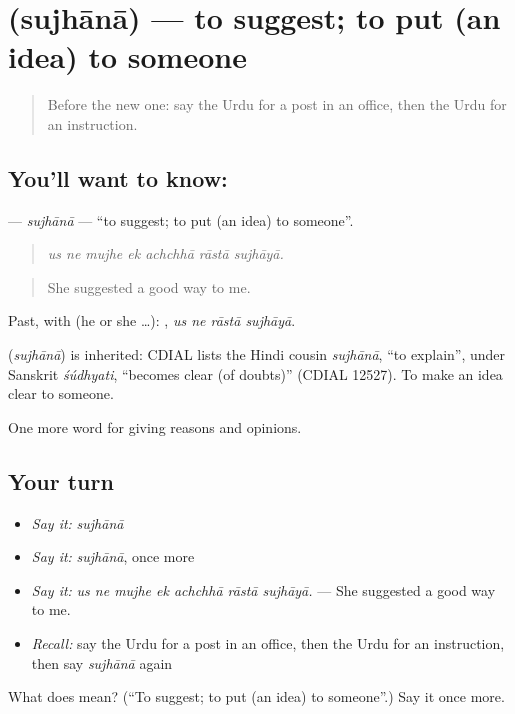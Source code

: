\section[\texorpdfstring{\ur{سجھانا} (sujhānā)}{سجھانا (sujhānā)}]{ (sujhānā) — to suggest; to put (an idea) to someone}

\label{lesson:UR-C343-sujhana}



\begin{quote}
Before the new one: say the Urdu for a post in an office, then the Urdu for an instruction.
\end{quote}

\subsection*{You'll want to know: }
\textbf{} — \emph{sujhānā} — \textquotedblleft{}to suggest; to put (an idea) to someone\textquotedblright{}.

\begin{quote}
      
\end{quote}

\begin{quote}
\emph{us ne mujhe ek achchhā rāstā sujhāyā.}
\end{quote}

\begin{quote}
She suggested a good way to me.
\end{quote}

Past, with  (he or she …):    , \emph{us ne rāstā sujhāyā}.

\begin{cousinweb}
\textbf{} (\emph{sujhānā}) is inherited: CDIAL lists the Hindi cousin \emph{sujhānā}, \textquotedblleft{}to explain\textquotedblright{}, under Sanskrit \emph{śúdhyati}, \textquotedblleft{}becomes clear (of doubts)\textquotedblright{} (CDIAL 12527). To make an idea clear to someone.
\end{cousinweb}

\begin{grammarlens}[title={What you've built}]
One more word for giving reasons and opinions.
\end{grammarlens}

\subsection*{Your turn}
\begin{itemize}
\raggedright
  \item \emph{Say it:} \emph{sujhānā}
  \item \emph{Say it:} \emph{sujhānā}, once more
  \item \emph{Say it:} \emph{us ne mujhe ek achchhā rāstā sujhāyā.} — She suggested a good way to me.
  \item \emph{Recall:} say the Urdu for a post in an office, then the Urdu for an instruction, then say \emph{sujhānā} again
\end{itemize}

\begin{tcolorbox}[breakable,colback=teal!4,colframe=teal!35!black,title={Before you move on}]
What does  mean? (\textquotedblleft{}To suggest; to put (an idea) to someone\textquotedblright{}.) Say it once more.
\end{tcolorbox}
